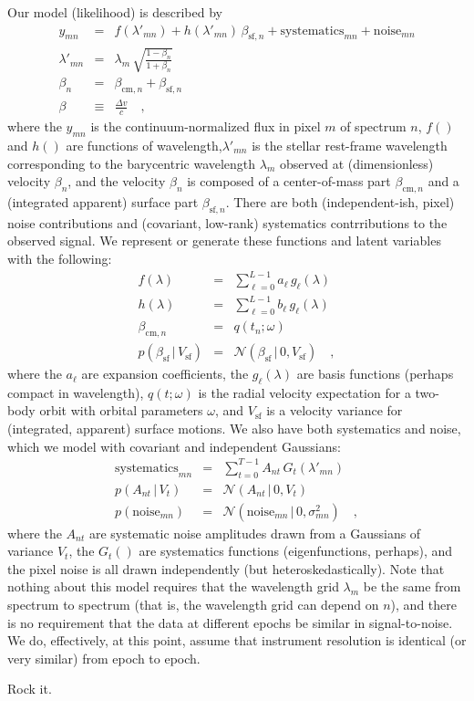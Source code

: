 \documentclass[12pt, letterpaper]{article}
\newcommand{\given}{\,|\,}
\newcommand{\normal}{{\mathcal{N}}}
\newcommand{\com}{\mathrm{cm}}
\newcommand{\surf}{\mathrm{sf}}
\begin{document}
Our model (likelihood) is described by
\begin{eqnarray}
  y_{mn} &=& f(\lambda'_{mn}) + h(\lambda'_{mn})\,\beta_{\surf, n} + \mathrm{systematics}_{mn} + \mathrm{noise}_{mn}
  \\
  \lambda'_{mn} &=& \lambda_m\,\sqrt{\frac{1 - \beta_n}{1 + \beta_n}}
  \\
  \beta_n &=& \beta_{\com,n} + \beta_{\surf, n}
  \\
  \beta &\equiv& \frac{\Delta v}{c}
  \quad , 
\end{eqnarray}
where the $y_{mn}$ is the continuum-normalized flux in pixel $m$ of
spectrum $n$, $f()$ and $h()$ are functions of
wavelength,$\lambda'_{mn}$ is the stellar rest-frame wavelength
corresponding to the barycentric wavelength $\lambda_m$ observed at
(dimensionless) velocity $\beta_n$, and the velocity $\beta_n$ is
composed of a center-of-mass part $\beta_{\com,n}$ and a (integrated
apparent) surface part $\beta_{\surf,n}$.
There are both (independent-ish, pixel) noise contributions and
(covariant, low-rank) systematics contrributions to the observed
signal.
We represent or generate these functions and latent variables
with the following:
\begin{eqnarray}
  f(\lambda) &=& \sum_{\ell=0}^{L-1} a_\ell\,g_\ell(\lambda)
  \\
  h(\lambda) &=& \sum_{\ell=0}^{L-1} b_\ell\,g_\ell(\lambda)
  \\
  \beta_{\com,n} &=& q(t_n; \omega)
  \\
  p(\beta_\surf \given V_\surf) &=& \normal(\beta_\surf \given 0, V_\surf)
  \quad ,
\end{eqnarray}
where the $a_\ell$ are expansion coefficients, the $g_\ell(\lambda)$
are basis functions (perhaps compact in wavelength), $q(t;\omega)$ is
the radial velocity expectation for a two-body orbit with orbital
parameters $\omega$, and $V_\surf$ is a velocity variance for
(integrated, apparent) surface motions.
We also have both systematics and noise, which we model with covariant
and independent Gaussians:
\begin{eqnarray}
  \mathrm{systematics}_{mn} &=& \sum_{t=0}^{T-1} A_{nt}\,G_t(\lambda'_{mn})
  \\
  p(A_{nt}\given V_t) &=& \normal(A_{nt}\given 0,V_t)
  \\
  p(\mathrm{noise}_{mn}) &=& \normal(\mathrm{noise}_{mn}\given 0,\sigma_{mn}^2)
  \quad ,
\end{eqnarray}
where the $A_{nt}$ are systematic noise amplitudes drawn from a
Gaussians of variance $V_t$, the $G_{t}()$ are systematics functions
(eigenfunctions, perhaps), and the pixel noise is all drawn
independently (but heteroskedastically).
Note that nothing about this model requires that the wavelength grid
$\lambda_m$ be the same from spectrum to spectrum (that is, the
wavelength grid can depend on $n$), and there is no requirement that
the data at different epochs be similar in signal-to-noise. We do,
effectively, at this point, assume that instrument resolution is
identical (or very similar) from epoch to epoch.

Rock it.
\end{document}
